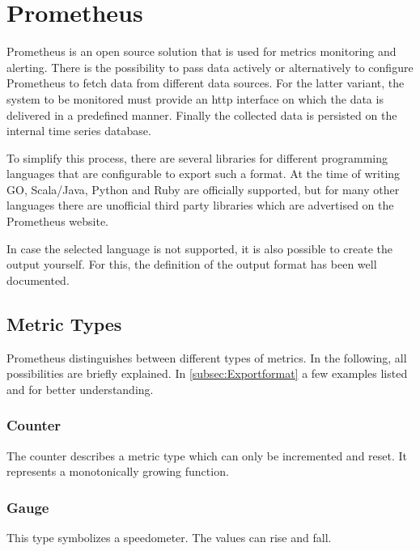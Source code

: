 \section{Prometheus}
Prometheus is an open source solution that is used for metrics monitoring and alerting. There is the possibility to pass data actively or alternatively to configure Prometheus to fetch data from different data sources. For the latter variant, the system to be monitored must provide an \gls{http} interface on which the data is delivered in a predefined manner. Finally the collected data is persisted on the internal time series database.

To simplify this process, there are several libraries for different programming languages that are configurable to export such a format. At the time of writing GO, Scala/Java, Python and Ruby are officially supported, but for many other languages there are unofficial third party libraries which are advertised on the Prometheus website. 

In case the selected language is not supported, it is also possible to create the output yourself. For this, the definition of the output format has been well documented.
\subsection{Metric Types}
Prometheus distinguishes between different types of metrics. In the following, all possibilities are briefly explained. In \autoref{subsec:Exportformat} a few examples listed and for better understanding.
\subsubsection{Counter}
The counter describes a metric type which can only be incremented and reset. It represents a monotonically growing function. 
\subsubsection{Gauge}
This type symbolizes a speedometer. The values can rise and fall.

